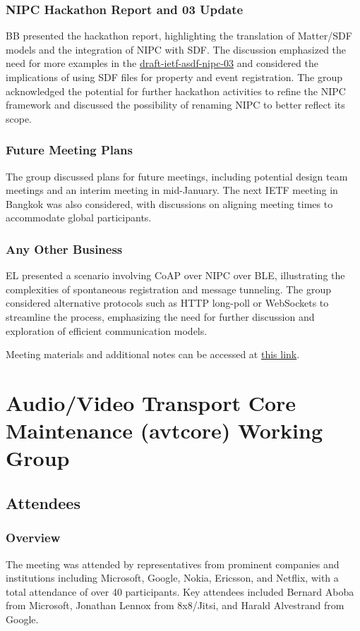 \documentclass{article}
\begin{document}
\subsubsection{NIPC Hackathon Report and 03 Update}
BB presented the hackathon report, highlighting the translation of Matter/SDF models and the integration of NIPC with SDF. The discussion emphasized the need for more examples in the \href{https://datatracker.ietf.org/doc/html/draft-ietf-asdf-nipc-03}{draft-ietf-asdf-nipc-03} and considered the implications of using SDF files for property and event registration. The group acknowledged the potential for further hackathon activities to refine the NIPC framework and discussed the possibility of renaming NIPC to better reflect its scope.

\subsubsection{Future Meeting Plans}
The group discussed plans for future meetings, including potential design team meetings and an interim meeting in mid-January. The next IETF meeting in Bangkok was also considered, with discussions on aligning meeting times to accommodate global participants.

\subsubsection{Any Other Business}
EL presented a scenario involving CoAP over NIPC over BLE, illustrating the complexities of spontaneous registration and message tunneling. The group considered alternative protocols such as HTTP long-poll or WebSockets to streamline the process, emphasizing the need for further discussion and exploration of efficient communication models.

Meeting materials and additional notes can be accessed at \href{https://notes.ietf.org/notes-ietf-121-asdf}{this link}.



\newpage

\section{Audio/Video Transport Core Maintenance (avtcore) Working Group}

\subsection{Attendees}
\subsubsection{Overview}
The meeting was attended by representatives from prominent companies and institutions including Microsoft, Google, Nokia, Ericsson, and Netflix, with a total attendance of over 40 participants. Key attendees included Bernard Aboba from Microsoft, Jonathan Lennox from 8x8/Jitsi, and Harald Alvestrand from Google.
\end{document}
